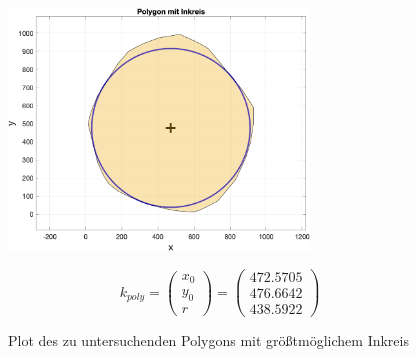 \documentclass[12pt]{scrartcl}
\begin{document}
\begin{figure}[ht]
    \centering
    \begin{minipage}[c]{8cm}
        \includegraphics[width=8cm]{Polygon.png}
    \end{minipage}%
    \begin{minipage}[c]{7cm}
        \begin{equation}
            k_{poly} = \begin{pmatrix} x_0 \\ y_0 \\ r \end{pmatrix} = \begin{pmatrix} 472.5705 \\ 476.6642 \\ 438.5922 \end{pmatrix}
        \end{equation}
    \end{minipage}
    \caption{Plot des zu untersuchenden Polygons mit größtmöglichem Inkreis}
    \label{fig:Polygon}
\end{figure}


\end{document}
